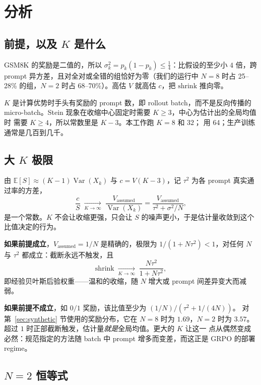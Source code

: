 \documentclass{article}
\newcommand{\shrink}{\mathrm{shrink}}
\newcommand{\E}{\mathbb{E}}
\newcommand{\Var}{\operatorname{Var}}
\begin{document}
\section{分析}
\label{sec:analysis}

\subsection{前提，以及 $K$ 是什么}

GSM8K 的奖励是二值的，所以 $\sigma_k^2=p_k(1-p_k)\le\tfrac14$：比假设的至少小
$4$ 倍，跨 prompt 异方差，且对全对或全错的组恰好为零（我们的运行中 $N=8$ 时占
25--28\% 的组，$N=2$ 时占 68--70\%）。高估 $V$ 就高估 $c$，把 $\shrink$ 推向零。

$K$ 是计算优势时手头有奖励的 prompt 数，即 rollout batch，而不是反向传播的
micro-batch。Stein 现象在收缩中心固定时需要 $K\ge3$，中心为估计出的全局均值时
需要 $K\ge4$，所以常数里是 $K-3$。本工作跑 $K=8$ 和 $32$；
\citet{zeng2025shrinking} 用 64；生产训练通常是几百到几千。

\subsection{大 $K$ 极限}

由 $\E[S]\approx(K-1)\Var(X_k)$ 与 $c=V(K-3)$，记 $\tau^2$ 为各 prompt 真实通
过率的方差，
\begin{equation}
\frac{c}{S}\;\xrightarrow[K\to\infty]{}\;
\frac{V_{\text{assumed}}}{\Var(X_k)}
=\frac{V_{\text{assumed}}}{\tau^2+\sigma^2/N},
\label{eq:limit}
\end{equation}
是一个常数。$K$ 不会让收缩更强，只会让 $S$ 的噪声更小，于是估计量收敛到这个
比值决定的行为。

\textbf{如果前提成立}，$V_{\text{assumed}}=1/N$ 是精确的，极限为
$1/(1+N\tau^2)<1$，对任何 $N$ 与 $\tau^2$ 都成立：截断永远不触发，且
\begin{equation}
\shrink\;\xrightarrow[K\to\infty]{}\;\frac{N\tau^2}{1+N\tau^2},
\label{eq:eb}
\end{equation}
即经验贝叶斯后验权重——温和的收缩，随 $N$ 增大或 prompt 间差异变大而减弱。

\textbf{如果前提不成立}，如 $0/1$ 奖励，该比值至少为 $(1/N)/(\tau^2+1/(4N))$。
对第~\ref{sec:synthetic} 节使用的奖励分布，它在 $N=8$ 时为 $1.69$，$N=2$ 时为
$3.57$。超过 $1$ 时正部截断触发，估计量\emph{就是}全局均值。更大的 $K$ 让这一
点从偶然变成必然：规范指定的方法随 batch 中 prompt 增多而变差，而这正是
GRPO 的部署 regime。

\subsection{$N=2$ 恒等式}
\label{sec:identity}
\end{document}
